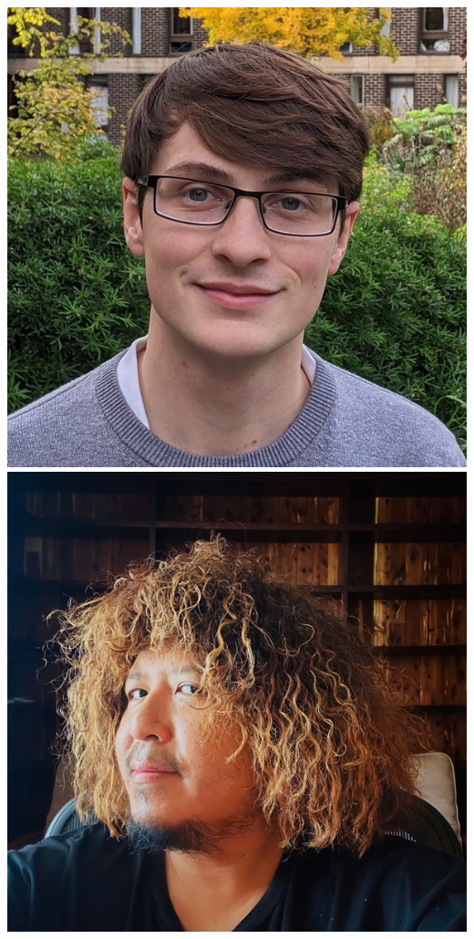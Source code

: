 \documentclass[aspectratio=169]{beamer}
\begin{document}
\begin{frame}
{        \includegraphics[width=0.09\textheight]{figures/students/thomas_gessey-jones.jpg}%
        \includegraphics[width=0.09\textheight]{figures/students/tze_goh.jpg}%
}
\end{frame}
\end{document}
